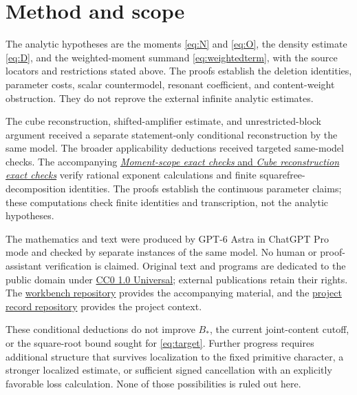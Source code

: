 \documentclass[11pt]{article}
\theoremstyle{remark}\newtheorem{remark}[theorem]{Remark}
\newcommand{\workbenchurl}{https://github.com/KokunoYumeto/zeta-and-l-functions-workbench}
\newcommand{\recordurl}{https://github.com/KokunoYumeto/mathematics-workbenches}
\begin{document}
\section{Method and scope}\label{sec:method}

The analytic hypotheses are the moments \eqref{eq:N} and \eqref{eq:O}, the density estimate \eqref{eq:D}, and the weighted-moment summand \eqref{eq:weightedterm}, with the source locators and restrictions stated above. The proofs establish the deletion identities, parameter costs, scalar countermodel, resonant coefficient, and content-weight obstruction. They do not reprove the external infinite analytic estimates.

The cube reconstruction, shifted-amplifier estimate, and unrestricted-block argument received a separate statement-only conditional reconstruction by the same model. The broader applicability deductions received targeted same-model checks. The accompanying \href{\workbenchurl}{\emph{Moment-scope exact checks} and \emph{Cube reconstruction exact checks}} verify rational exponent calculations and finite squarefree-decomposition identities. The proofs establish the continuous parameter claims; these computations check finite identities and transcription, not the analytic hypotheses.

The mathematics and text were produced by GPT-6 Astra in ChatGPT Pro mode and checked by separate instances of the same model. No human or proof-assistant verification is claimed. Original text and programs are dedicated to the public domain under \href{https://creativecommons.org/publicdomain/zero/1.0/}{CC0 1.0 Universal}; external publications retain their rights. The \href{\workbenchurl}{workbench repository} provides the accompanying material, and the \href{\recordurl}{project record repository} provides the project context.

These conditional deductions do not improve $B_*$, the current joint-content cutoff, or the square-root bound sought for \eqref{eq:target}. Further progress requires additional structure that survives localization to the fixed primitive character, a stronger localized estimate, or sufficient signed cancellation with an explicitly favorable loss calculation. None of those possibilities is ruled out here.
\end{document}

